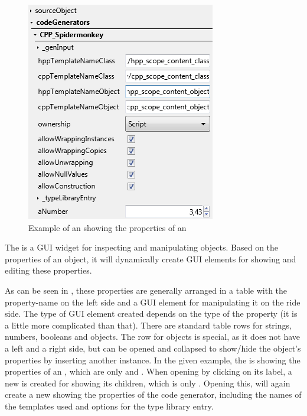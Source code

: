 \begin{figure}
  \vspace{-20pt}
  \begin{center}
    \includegraphics[scale=0.60]{Images/ObjectExplorer.png}
  \end{center}
  \caption{Example of an  showing the properties of an }
  \label{fig:ObjectExplorer}
  \vspace{-15pt}
\end{figure}

The  is a GUI widget for inspecting and manipulating  objects. Based on the properties of an object, it will dynamically create GUI elements for showing and editing these properties.

As can be seen in , these properties are generally arranged in a table with the property-name on the left side and a GUI element for manipulating it on the ride side. The type of GUI element created depends on the type of the property (it is a little more complicated than that). There are standard table rows for strings, numbers, booleans and objects. The row for objects is special, as it does not have a left and a right side, but can be opened and collapsed to show/hide the object's properties by inserting another  instance. In the given example, the  is showing the properties of an , which are only  and . When opening  by clicking on its label, a new  is created for showing its children, which is only . Opening this, will again create a new  showing the properties of the  code generator, including the names of the templates used and options for the type library entry.

